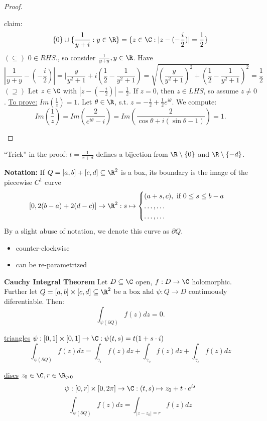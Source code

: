 \begin{proof}
\begin{enumerate}[Case (1)]
    claim:
      $$\{0\}\cup\{\frac{1}{y+i}:y\in\R\}=\{z\in\C:|z-(-\frac{i}{2})|=\frac{1}{2}\}$$
    $(\subseteq)$ $0\in RHS.$, so consider $\frac{1}{y+y},y\in \R$. Have $$|\frac{1}{y+y}-(-\frac{i}{2})|=|\frac{y}{y^2+1}+i \left(\frac{1}{2}-\frac{1}{y^2+1}\right)=\sqrt{\left(\frac{y}{y^2+1}\right)^2+\left(\frac{1}{2}-\frac{1}{y^2+1}\right)^2}=\frac{1}{2}$$
    $(\supseteq)$ Let $z\in \C$ with $|z-(-\frac{i}{2})|=\frac{1}{2}$. If $z=0$, then $z\in LHS$, so assume $z\neq 0$.
    \newline \underline{To prove:} $Im(\frac{1}{z})=1$.
    \newline Let $\theta\in\R$, s.t. $z=-\frac{i}{2}+\frac{1}{2}e^{i\theta}$. We compute: $$Im\left(\frac{1}{z}\right)=Im\left(\frac{2}{e^{i\theta}-i}\right)=Im \left(\frac{2}{\cos \theta+i(\sin \theta -1)}\right)=1.$$
\end{enumerate}
\qedhere
\end{proof}
\begin{remark}
  ``Trick'' in the proof: $t=\frac{1}{x+d}$ defines a bijection from $\R\setminus\{0\}$ and $\R\setminus\{-d\}$.
\end{remark}

\textbf{Notation:} If $Q=[a,b]+[c,d] \subseteq \R^2$ is a box, its boundary is the image of the piecewise $C^1$ curve
  $$[0,2(b-a)+2(d-c)]\to \R^2: s\mapsto
    \begin{cases}
      (a+s,c), \text{ if }0\leq s \leq b-a \\
      \dots , \dots \\
      \dots, \dots
    \end{cases}
  $$
By a slight abuse of notation, we denote this curve as $\partial Q$.
  \begin{itemize}
    \item counter-clockwise
    \item can be re-parametrized
  \end{itemize}
\begin{theorem}\label{CauchyInt}
  \textbf{Cauchy Integral Theorem}
  \newline Let $D\subseteq \C$ open, $f:D\to \C$ holomorphic. Further let $Q=[a,b]\times [c,d]\subseteq \R^2$ be a box ahd $\psi:Q\to D$ continuously diferentiable. Then:
     $$\int_{\psi(\partial Q)}^{}f(z)dz=0.$$
\end{theorem}

\begin{example}
  \underline{triangles}
  \newline $\psi:[0,1]\times[0,1]\to \C: \psi(t,s)=t(1+s \cdot i)$
    $$\int_{\psi(\partial Q)}^{}f(z)dz=\int_{\gamma_1}f(z)dz+ \int_{\gamma_2}f(z)dz+\int_{\gamma_3}f(z)dz$$
\end{example}
\begin{example}
  \underline{discs}
  \newline $z_0\in \C, r\in\R_{>0}$
    $$\psi:[0,r]\times[0,2\pi]\to \C:(t,s)\mapsto z_0+t \cdot e^{is}$$
    $$\int_{\psi(\partial Q)}^{ }f(z)dz=\int_{|z-z_0|=r}^{}f(z)dz$$
\end{example}

